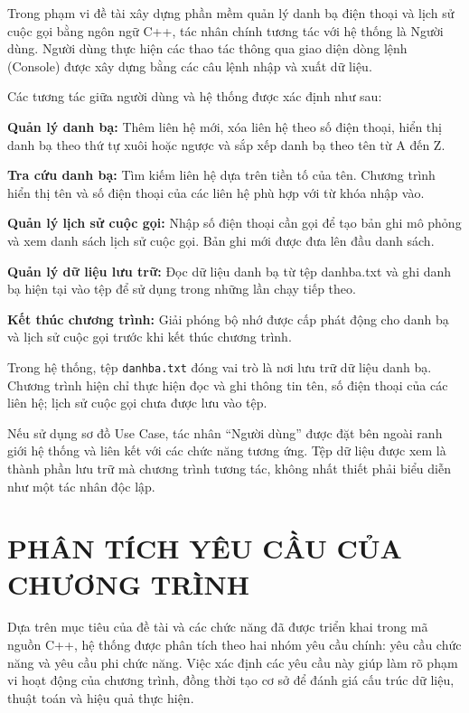 \documentclass[12pt,a4paper]{report}
\begin{document}
Trong phạm vi đề tài xây dựng phần mềm quản lý danh bạ điện thoại và lịch sử cuộc gọi bằng ngôn ngữ C++, tác nhân chính tương tác với hệ thống là Người dùng. Người dùng thực hiện các thao tác thông qua giao diện dòng lệnh (Console) được xây dựng bằng các câu lệnh nhập và xuất dữ liệu.\par
Các tương tác giữa người dùng và hệ thống được xác định như sau:\par
\noindent\textbf{Quản lý danh bạ:} Thêm liên hệ mới, xóa liên hệ theo số điện thoại, hiển thị danh bạ theo thứ tự xuôi hoặc ngược và sắp xếp danh bạ theo tên từ A đến Z.\par
\noindent\textbf{Tra cứu danh bạ:} Tìm kiếm liên hệ dựa trên tiền tố của tên. Chương trình hiển thị tên và số điện thoại của các liên hệ phù hợp với từ khóa nhập vào.\par
\noindent\textbf{Quản lý lịch sử cuộc gọi:} Nhập số điện thoại cần gọi để tạo bản ghi mô phỏng và xem danh sách lịch sử cuộc gọi. Bản ghi mới được đưa lên đầu danh sách.\par
\noindent\textbf{Quản lý dữ liệu lưu trữ:} Đọc dữ liệu danh bạ từ tệp danhba.txt và ghi danh bạ hiện tại vào tệp để sử dụng trong những lần chạy tiếp theo.\par
\noindent\textbf{Kết thúc chương trình:} Giải phóng bộ nhớ được cấp phát động cho danh bạ và lịch sử cuộc gọi trước khi kết thúc chương trình.\par
Trong hệ thống, tệp \texttt{danhba.txt} đóng vai trò là nơi lưu trữ dữ liệu danh bạ. Chương trình hiện chỉ thực hiện đọc và ghi thông tin tên, số điện thoại của các liên hệ; lịch sử cuộc gọi chưa được lưu vào tệp.\par
Nếu sử dụng sơ đồ Use Case, tác nhân “Người dùng” được đặt bên ngoài ranh giới hệ thống và liên kết với các chức năng tương ứng. Tệp dữ liệu được xem là thành phần lưu trữ mà chương trình tương tác, không nhất thiết phải biểu diễn như một tác nhân độc lập.\par
\section{PHÂN TÍCH YÊU CẦU CỦA CHƯƠNG TRÌNH}

Dựa trên mục tiêu của đề tài và các chức năng đã được triển khai trong mã nguồn C++, hệ thống được phân tích theo hai nhóm yêu cầu chính: yêu cầu chức năng và yêu cầu phi chức năng. Việc xác định các yêu cầu này giúp làm rõ phạm vi hoạt động của chương trình, đồng thời tạo cơ sở để đánh giá cấu trúc dữ liệu, thuật toán và hiệu quả thực hiện.\par
\end{document}
